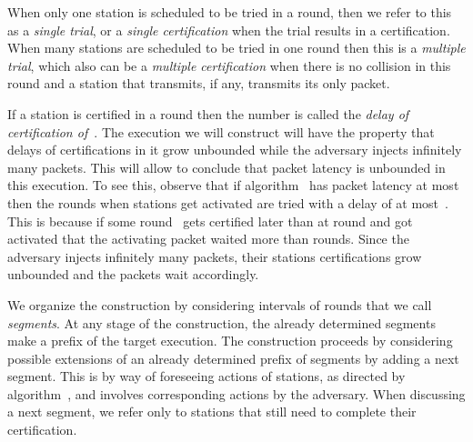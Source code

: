 \documentclass[11pt]{article}
\begin{document}
When only one station is scheduled to be tried in a round, then we refer to this as a \emph{single trial}, or a \emph{single certification} when the trial results in a certification.
When many stations are scheduled to be tried in one round then this is a \emph{multiple trial}, which also can be a \emph{multiple certification} when there is no collision in this round and a station that transmits, if any, transmits its only packet.


If a station  is certified in a round  then the number  is called the \emph{delay of certification of~}.
The execution we will construct will have the property that delays of certifications in it grow unbounded while the adversary injects infinitely many packets.
This will allow to conclude that packet latency is unbounded in this execution.
To see this, observe that if algorithm~ has packet latency at most~  then the rounds when stations get activated are tried with a delay of at most~. 
This is because if some round~ gets certified later than at round  and  got activated that the activating packet waited more than  rounds.
Since the adversary injects infinitely many packets, their stations certifications grow unbounded and the packets wait accordingly.

We organize the construction by considering intervals of rounds that we call \emph{segments}. At any stage of the construction, the already determined segments make a prefix  of the target execution.
The construction proceeds by considering  possible extensions of an already determined prefix of segments by adding a next segment.
This is by way of foreseeing actions of stations, as directed by  algorithm~, and involves corresponding actions by the adversary. 
When discussing a next segment, we refer only to stations that still need to complete their certification.
\end{document}
